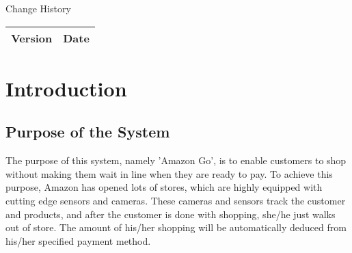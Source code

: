 \documentclass[11pt]{article}
\begin{document}


\newpage

\begin{center}
    \Huge{Change History} 
\end{center}{}
 


\begin{table}[H]
\begin{center}
    

\begin{tabular}{|l|l|}
\hline
\textbf{\Huge{Version}} & \textbf{\Huge{Date}}  \\ \hline
\end{tabular}
\end{center}
\end{table}

\newpage



\begin{flushleft}
    \tableofcontents
\end{flushleft}

\newpage

\begin{flushleft}
    \listoffigures
\end{flushleft}

\newpage

\begin{flushleft}
    \listoftables
\end{flushleft}

\newpage


\section{Introduction}

    \subsection{Purpose of the System}

    The purpose of this system, namely 'Amazon Go', is to enable customers to shop without making them wait in line when they 
    are ready to pay. To achieve this purpose, Amazon has opened lots of stores, which are highly equipped with cutting edge 
    sensors and cameras. These cameras and sensors track the customer and products, and after the customer is done with shopping, 
    she/he just walks out of store. The amount of his/her shopping will be automatically deduced from his/her specified payment method.
        
\end{document}
